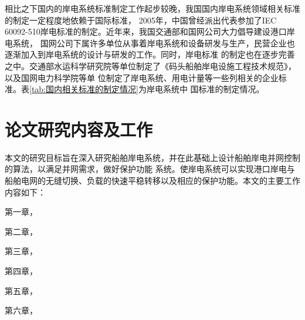 相比之下国内的岸电系统标准制定工作起步较晚，我国国内岸电系统领域相关标准的制定一定程度地依赖于国际标准\cite{SP4}，
2005年，中国曾经派出代表参加了IEC 60092-510岸电标准的制定。近年来，我国交通部和国网公司大力倡导建设港口岸电系统，
国网公司下属许多单位从事着岸电系统和设备研发与生产，民营企业也逐渐加入到岸电系统的设计与研发的工作。同时，岸电标准
的制定也在逐步完善之中。交通部水运科学研究院等单位制定了《码头船舶岸电设施工程技术规范》，以及国网电力科学院等单
位制定了岸电系统、用电计量等一些列相关的企业标准\cite{SP14}。表\ref{tab:国内相关标准的制定情况}为岸电系统中
国标准的制定情况。

\begin{table}[!htp]
	\centering
	\caption[国内相关标准的制定情况]{国内相关标准的制定情况}
	\label{tab:国内相关标准的制定情况}
\end{table}

\section{论文研究内容及工作}
本文的研究目标旨在深入研究船舶岸电系统，并在此基础上设计船舶岸电并网控制的算法，以满足并网需求，做好保护功能
系统。使岸电系统可以实现港口岸电与船舶电网的无缝切换、负载的快速平稳转移以及相应的保护功能。本文的主要工作内容如下：

第一章，

第二章，

第三章，

第四章，

第五章，

第六章，


